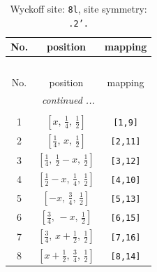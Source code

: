 \documentclass[fleqn,8pt]{jsarticle}
\begin{document}
\begin{longtable}{ccc}
\caption{Wyckoff site: {\tt 8l}, site symmetry: {\tt .2'.}}
 \\
 \hline \hline
No. & position & mapping \\ \hline \endfirsthead

\multicolumn{2}{l}{\tablename\ \thetable{}} \\
 \hline \hline
No. & position & mapping \\ \hline \endhead

 \hline \hline
\multicolumn{2}{r}{\footnotesize\it continued ...} \\ \endfoot

 \hline \hline
\multicolumn{2}{r}{} \\ \endlastfoot

1 & $\left[ x,\, \frac{1}{4},\, \frac{1}{2} \right]$ & {\tt [1,9]} \\ \hline
2 & $\left[ \frac{1}{4},\, x,\, \frac{1}{2} \right]$ & {\tt [2,11]} \\ \hline
3 & $\left[ \frac{1}{4},\, \frac{1}{2} - x,\, \frac{1}{2} \right]$ & {\tt [3,12]} \\ \hline
4 & $\left[ \frac{1}{2} - x,\, \frac{1}{4},\, \frac{1}{2} \right]$ & {\tt [4,10]} \\ \hline
5 & $\left[ - x,\, \frac{3}{4},\, \frac{1}{2} \right]$ & {\tt [5,13]} \\ \hline
6 & $\left[ \frac{3}{4},\, - x,\, \frac{1}{2} \right]$ & {\tt [6,15]} \\ \hline
7 & $\left[ \frac{3}{4},\, x + \frac{1}{2},\, \frac{1}{2} \right]$ & {\tt [7,16]} \\ \hline
8 & $\left[ x + \frac{1}{2},\, \frac{3}{4},\, \frac{1}{2} \right]$ & {\tt [8,14]} \\
\end{longtable}
\renewcommand{\arraystretch}{1.2}
\end{document}
